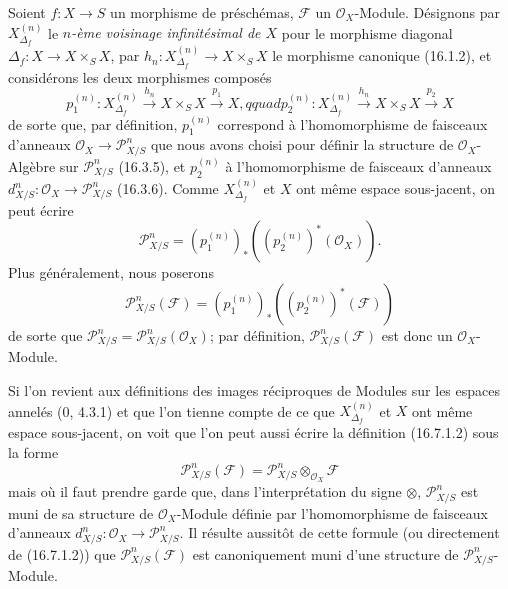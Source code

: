 \begin{env}[16.7.1]
\label{IV.16.7.1}
Soient $f:X\to S$ un morphisme de préschémas, $\mathscr{F}$ un
$\mathcal{O}_X$-Module. Désignons par $X_{\Delta_f}^{(n)}$ le \emph{$n$-ème
voisinage infinitésimal de $X$} pour le morphisme diagonal
$\Delta_f:X\to X\times_S X$, par
$h_n:X_{\Delta_f}^{(n)}\to X\times_S X$ le morphisme canonique (16.1.2), et
considérons les deux morphismes composés
\[
  p_1^{(n)}:X_{\Delta_f}^{(n)}\xrightarrow{h_n}X\times_S X
  \xrightarrow{p_1}X,qquad
  p_2^{(n)}:X_{\Delta_f}^{(n)}\xrightarrow{h_n}X\times_S X
  \xrightarrow{p_2}X
\]
de sorte que, par définition, $p_1^{(n)}$ correspond à l'homomorphisme de
faisceaux d'anneaux $\mathcal{O}_X\to\mathscr{P}_{X/S}^n$ que nous avons
choisi pour définir la structure de $\mathcal{O}_X$-Algèbre sur
$\mathscr{P}_{X/S}^n$ (16.3.5), et $p_2^{(n)}$ à l'homomorphisme de faisceaux
d'anneaux $d_{X/S}^n:\mathcal{O}_X\to\mathscr{P}_{X/S}^n$ (16.3.6). Comme
$X_{\Delta_f}^{(n)}$ et $X$ ont même espace sous-jacent, on peut écrire
\[
  \mathscr{P}_{X/S}^n
  =(p_1^{(n)})_*((p_2^{(n)})^*(\mathcal{O}_X)).
  \tag{16.7.1.1}
  \label{IV.16.7.1.1}
\]
Plus généralement, nous poserons
\[
  \mathscr{P}_{X/S}^n(\mathscr{F})
  =(p_1^{(n)})_*((p_2^{(n)})^*(\mathscr{F}))
  \tag{16.7.1.2}
  \label{IV.16.7.1.2}
\]
de sorte que
$\mathscr{P}_{X/S}^n=\mathscr{P}_{X/S}^n(\mathcal{O}_X)$; par définition,
$\mathscr{P}_{X/S}^n(\mathscr{F})$ est donc un $\mathcal{O}_X$-Module.
\end{env}

\begin{env}[16.7.2]
\label{IV.16.7.2}
Si l'on revient aux définitions des images réciproques de Modules sur les
espaces annelés (0, 4.3.1) et que l'on tienne compte de ce que
$X_{\Delta_f}^{(n)}$ et $X$ ont même espace sous-jacent, on voit que l'on peut
aussi écrire la définition (16.7.1.2) sous la forme
\[
  \mathscr{P}_{X/S}^n(\mathscr{F})
  =\mathscr{P}_{X/S}^n\otimes_{\mathcal{O}_X}\mathscr{F}
  \tag{16.7.2.1}
  \label{IV.16.7.2.1}
\]
mais où il faut prendre garde que, dans l'interprétation du signe $\otimes$,
$\mathscr{P}_{X/S}^n$ est muni de sa structure de $\mathcal{O}_X$-Module
définie par l'homomorphisme de faisceaux d'anneaux
$d_{X/S}^n:\mathcal{O}_X\to\mathscr{P}_{X/S}^n$. Il résulte aussitôt de cette
formule (ou directement de (16.7.1.2)) que
$\mathscr{P}_{X/S}^n(\mathscr{F})$ est canoniquement muni d'une structure de
$\mathscr{P}_{X/S}^n$-Module.
\end{env}


